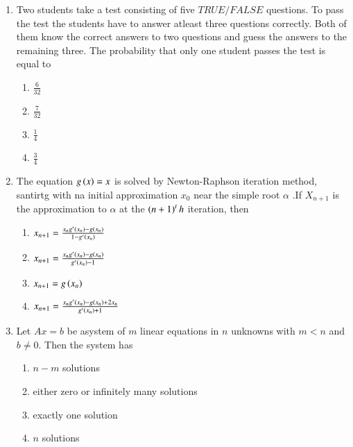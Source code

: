 \documentclass[journal]{IEEEtran}
\begin{document}
\begin{enumerate}
    \item Two students take a test consisting of five $TRUE / FALSE$ questions. To pass the test the students have to answer atleast three questions correctly. Both of them know the correct answers to two questions and guess the answers to the remaining three. The probability that only one student passes the test is equal to
        \begin{enumerate}
            \item $\frac{6}{32}$
            \item $\frac{7}{32}$
            \item $\frac{1}{4}$
            \item $\frac{3}{4}$
        \end{enumerate}

    \item The equation $g\left(x\right) = x$ is solved by Newton-Raphson iteration method, santirtg with
    na initial approximation $x_0$ near the simple root $\alpha$ .If $X_{n+1}$ is the approximation to
    $\alpha$ at the $\left(n+1\right)^th$ iteration, then
        \begin{enumerate}
            \item $x_{n+1} = \frac{x_n g^{\prime}\left(x_n\right)-g\left(x_n\right)}{1 - g^{\prime}\left(x_n\right)}$
            \item $x_{n+1} = \frac{x_n g^{\prime}\left(x_n\right)-g\left(x_n\right)}{g^{\prime}\left(x_n\right)-1}$
            \item $x_{n+1} = g\left(x_n\right)$
            \item $x_{n+1} = \frac{x_n g^{\prime}\left(x_n\right)-g\left(x_n\right)+ 2 x_n}{g^{\prime}\left(x_n\right)+1}$
        \end{enumerate}

    \item Let $Ax= b$ be asystem of $m$ linear equations in $n$ unknowns with $m< n$ and $b\neq0$. Then the system has
        \begin{enumerate}
            \item $n-m$ solutions
            \item either zero or infinitely many solutions
            \item exactly one solution
            \item $n$ solutions
        \end{enumerate}


\end{enumerate}
\end{document}
